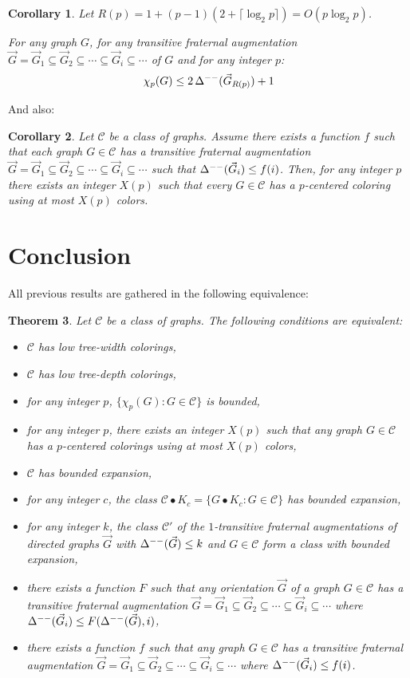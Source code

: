 \documentclass[a4paper]{amsart}
\newtheorem{theorem}{Theorem}[section]
\newtheorem{corollary}[theorem]{Corollary}
\theoremstyle{definition}
\theoremstyle{remark}
\DeclareMathOperator\md{\Delta^{\rm --}}
\def\vG{\vec{G}}
\begin{document}
\begin{corollary}
\label{cor:aug_chi}
Let $R(p)=1+(p-1)(2+\lceil\log_2 p\rceil)=O(p\log_2 p)$.

For any graph $G$, for any transitive fraternal augmentation
$\vG=\vG_1\subseteq\vG_2\subseteq\dotsb\subseteq \vG_i\subseteq\dotsb$
of $G$ and for any integer $p$:
\begin{equation}
 \chi_p(G)\leq 2\md(\vG_{R(p)})+1
\end{equation}
\end{corollary}
And also:
\begin{corollary}
\label{cor:aug_chi2}
Let $\mathcal C$ be a class of graphs.
Assume there exists a function $f$ such that each graph $G\in\mathcal
C$ has a transitive fraternal augmentation
$\vG=\vG_1\subseteq\vG_2\subseteq\dotsb\subseteq \vG_i\subseteq\dotsb$
such that $\md(\vG_i)\leq f(i)$. Then, for any integer $p$ there
exists an integer $X(p)$ such that every $G\in\mathcal C$ has a
$p$-centered coloring using at most $X(p)$ colors.
\end{corollary}
\section{Conclusion}
\label{sec:cncl}
All previous results are gathered in the
following equivalence:
\begin{theorem}
\label{thm:main}
Let $\mathcal C$ be a class of graphs. The following conditions are
equivalent:
\begin{itemize}
\item $\mathcal C$ has low tree-width colorings,
\item $\mathcal C$ has low tree-depth colorings,
\item for any integer $p$, $\{\chi_p(G): G\in\mathcal C\}$ is bounded,
\item for any integer $p$, there exists an integer $X(p)$ such that
any graph $G\in\mathcal C$ has a $p$-centered colorings using at most
$X(p)$ colors,
\item $\mathcal C$ has bounded expansion,
\item for any integer $c$, the class  $\mathcal C\bullet
  K_c=\{G\bullet K_c: G\in\mathcal C\}$ has bounded expansion,
\item for any integer $k$, the class $\mathcal C'$ of the
$1$-transitive fraternal augmentations of directed graphs $\vG$ with
$\md(\vG)\leq k$ and $G\in\mathcal C$ form a class with bounded expansion,
\item there exists a function $F$ such that
any orientation $\vG$ of a graph $G\in\mathcal C$ has a
  transitive fraternal augmentation
  $\vG=\vG_1\subseteq\vG_2\subseteq\dotsb\subseteq\vG_i\subseteq\dotsb$
  where $\md(\vG_i)\leq F(\md(\vG),i)$,
\item there exists a function $f$ such that
  any graph $G\in\mathcal C$ has a
  transitive fraternal augmentation
  $\vG=\vG_1\subseteq\vG_2\subseteq\dotsb\subseteq\vG_i\subseteq\dotsb$
  where $\md(\vG_i)\leq f(i)$.
\end{itemize}
\end{theorem}
\end{document}
